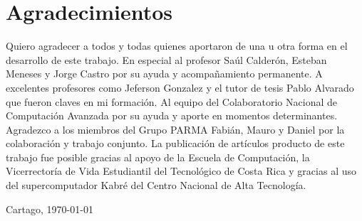\chapter*{Agradecimientos}
\thispagestyle{empty}

Quiero agradecer a todos y todas quienes aportaron de una u otra forma en el desarrollo de este trabajo. En especial al profesor Saúl Calderón, Esteban Meneses y Jorge Castro por su ayuda y acompañamiento permanente. A  excelentes profesores como Jeferson Gonzalez y el tutor de tesis Pablo Alvarado que fueron claves en mi formación. Al equipo del Colaboratorio Nacional de Computación Avanzada por su ayuda y aporte en momentos determinantes. Agradezco a los miembros del Grupo PARMA Fabián, Mauro y Daniel por la colaboración y trabajo conjunto. La publicación de artículos producto de este trabajo fue posible gracias al apoyo de la Escuela de Computación, la Vicerrectoría de Vida Estudiantil del Tecnológico de Costa Rica y gracias al uso del supercomputador Kabré del Centro Nacional de Alta Tecnología.

\vspace*{1cm}

\scriptAuthor

Cartago, \today

\cleardoublepage

